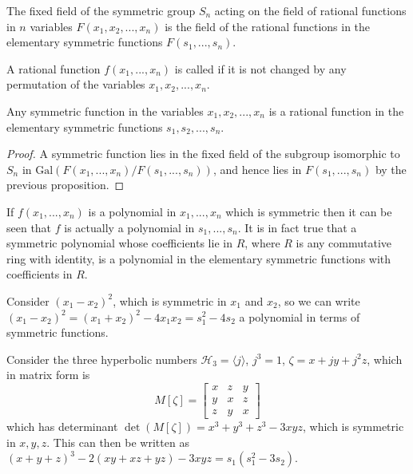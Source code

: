 \documentclass[12pt, a4paper, oneside, openright, titlepage]{book}
\begin{document}
\begin{prop}
    The fixed field of the symmetric group $S_n$ acting on the field of rational functions in $n$ variables $F(x_1,x_2,...,x_n)$ is the field of the rational functions in the elementary symmetric functions $F(s_1,...,s_n)$.
\end{prop}

\begin{defn}
    A rational function $f(x_1,...,x_n)$ is called  if it is not changed by any permutation of the variables $x_1,x_2,...,x_n$.
\end{defn}

\begin{cor}
    Any symmetric function in the variables $x_1,x_2,...,x_n$ is a rational function in the elementary symmetric functions $s_1,s_2,...,s_n$.
\end{cor}
\begin{proof}
    A symmetric function lies in the fixed field of the subgroup isomorphic to $S_n$ in $\text{Gal}(F(x_1,...,x_n)/F(s_1,...,s_n))$, and hence lies in $F(s_1,...,s_n)$ by the previous proposition.
\end{proof}

\begin{rmk}
    If $f(x_1,...,x_n)$ is a polynomial in $x_1,...,x_n$ which is symmetric then it can be seen that $f$ is actually a polynomial in $s_1,...,s_n$. It is in fact true that a symmetric polynomial whose coefficients lie in $R$, where $R$ is any commutative ring with identity, is a polynomial in the elementary symmetric functions with coefficients in $R$.
\end{rmk}

\begin{eg}
    Consider $(x_1-x_2)^2$, which is symmetric in $x_1$ and $x_2$, so we can write $(x_1-x_2)^2 = (x_1+x_2)^2 - 4x_1x_2 = s_1^2-4s_2$ a polynomial in terms of symmetric functions.
\end{eg}

\begin{eg}
    Consider the three hyperbolic numbers $\mathcal{H}_3 = \langle j\rangle$, $j^3 = 1$, $\zeta = x+jy+j^2z$, which in matrix form is \begin{equation*}
        M[\zeta] = \begin{bmatrix} x & z & y \\ y & x & z \\ z & y & x \end{bmatrix} 
    \end{equation*}
    which has determinant $\det(M[\zeta]) = x^3+y^3+z^3 - 3xyz$, which is symmetric in $x,y,z$. This can then be written as $(x+y+z)^3 -2(xy+xz+yz)-3xyz = s_1(s_1^2-3s_2)$. 
\end{eg}
\end{document}
